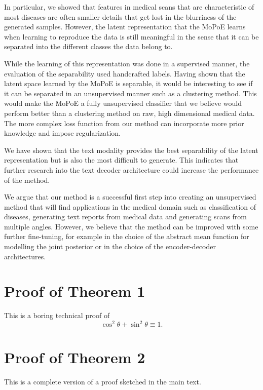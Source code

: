 \documentclass{midl} %
\begin{document}
    In particular, we showed that features in medical scans that are characteristic of most diseases are often smaller details that get lost in the blurriness of the generated samples.
    However, the latent representation that the MoPoE learns when learning to reproduce the data is still meaningful in the sense that it can be separated into the different classes the data belong to.

    While the learning of this representation was done in a supervised manner, the evaluation of the separability used handcrafted labels.
    Having shown that the latent space learned by the MoPoE is separable, it would be interesting to see if it can be separated in an unsupervised manner such as a clustering method.
    This would make the MoPoE a fully unsupervised classifier that we believe would perform better than a clustering method on raw, high dimensional medical data.
    The more complex loss function from our method can incorporate more prior knowledge and impose regularization.
    
    
    We have shown that the text modality provides the best separability of the latent representation but is also the most difficult to generate.
    This indicates that further research into the text decoder architecture could increase the performance of the method.
    
    
    
    We argue that our method is a successful first step into creating an unsupervised method that will find applications in the medical domain such as classification of diseases, generating text reports from medical data and generating scans from multiple angles.
    However, we believe that the method can be improved with some further fine-tuning, for example in the choice of the abstract mean function for modelling the joint posterior or in the choice of the encoder-decoder architectures.







\appendix

\section{Proof of Theorem 1}

This is a boring technical proof of
\begin{equation}\label{eq:example}
\cos^2\theta + \sin^2\theta \equiv 1.
\end{equation}

\section{Proof of Theorem 2}

This is a complete version of a proof sketched in the main text.
\end{document}
